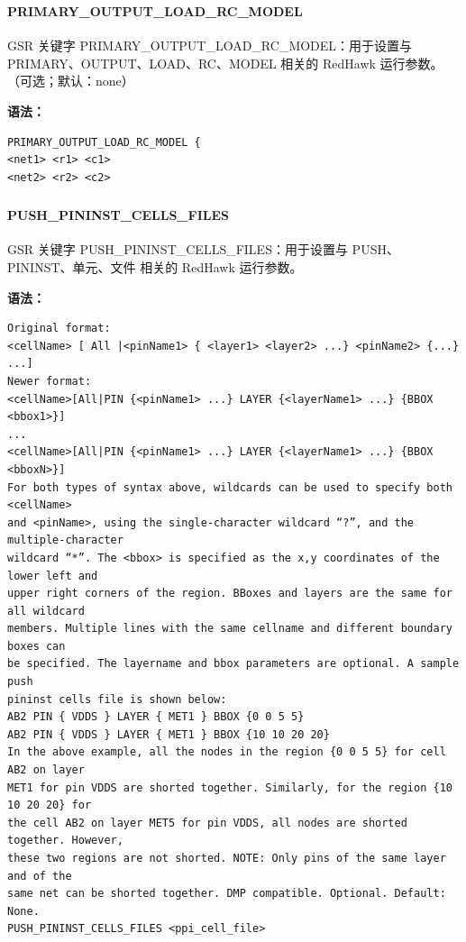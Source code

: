\subsubsection{}
\paragraph*{PRIMARY_OUTPUT_LOAD_RC_MODEL}

GSR 关键字 PRIMARY_OUTPUT_LOAD_RC_MODEL：用于设置与 PRIMARY、OUTPUT、LOAD、RC、MODEL 相关的 RedHawk 运行参数。（可选；默认：none）

\textbf{语法：}
\begin{lstlisting}
PRIMARY_OUTPUT_LOAD_RC_MODEL {
<net1> <r1> <c1>
<net2> <r2> <c2>
\end{lstlisting}

\subsubsection{}
\paragraph*{PUSH_PININST_CELLS_FILES}

GSR 关键字 PUSH_PININST_CELLS_FILES：用于设置与 PUSH、PININST、单元、文件 相关的 RedHawk 运行参数。

\textbf{语法：}
\begin{lstlisting}
Original format:
<cellName> [ All |<pinName1> { <layer1> <layer2> ...} <pinName2> {...} ...]
Newer format:
<cellName>[All|PIN {<pinName1> ...} LAYER {<layerName1> ...} {BBOX <bbox1>}]
...
<cellName>[All|PIN {<pinName1> ...} LAYER {<layerName1> ...} {BBOX <bboxN>}]
For both types of syntax above, wildcards can be used to specify both <cellName>
and <pinName>, using the single-character wildcard “?”, and the multiple-character
wildcard “*”. The <bbox> is specified as the x,y coordinates of the lower left and
upper right corners of the region. BBoxes and layers are the same for all wildcard
members. Multiple lines with the same cellname and different boundary boxes can
be specified. The layername and bbox parameters are optional. A sample push
pininst cells file is shown below:
AB2 PIN { VDDS } LAYER { MET1 } BBOX {0 0 5 5}
AB2 PIN { VDDS } LAYER { MET1 } BBOX {10 10 20 20}
In the above example, all the nodes in the region {0 0 5 5} for cell AB2 on layer
MET1 for pin VDDS are shorted together. Similarly, for the region {10 10 20 20} for
the cell AB2 on layer MET5 for pin VDDS, all nodes are shorted together. However,
these two regions are not shorted. NOTE: Only pins of the same layer and of the
same net can be shorted together. DMP compatible. Optional. Default: None.
PUSH_PININST_CELLS_FILES <ppi_cell_file>
\end{lstlisting}

